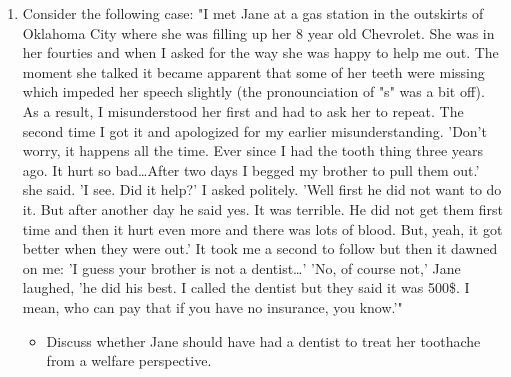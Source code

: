 \documentclass[a4paper]{article}
\begin{document}
\begin{enumerate}[resume]
\item Consider the following case: "I met Jane at a gas station in the outskirts of Oklahoma City where she was filling up her 8 year old Chevrolet. She was in her fourties and when I asked for the way she was happy to help me out. The moment she talked it became apparent that some of her teeth were missing which impeded her speech slightly (the pronounciation of "s" was a bit off). As a result, I misunderstood her first and had to ask her to repeat. The second time I got it and apologized for my earlier misunderstanding. 'Don't worry, it happens all the time. Ever since I had the tooth thing three years ago. It hurt so bad\ldots{}After two days I begged my brother to pull them out.' she said. 'I see. Did it help?' I asked politely. 'Well first he did not want to do it. But after another day he said yes. It was terrible. He did not get them first time and then it hurt even more and there was lots of blood. But, yeah, it got better when they were out.' It took me a second to follow but then it dawned on me: 'I guess your brother is  not a dentist\ldots{}' 'No, of course not,' Jane laughed, 'he did his best. I called the dentist but they said it was 500\$. I mean, who can pay that if you have no insurance, you know.'"
\begin{itemize}
\item Discuss whether Jane should have had a dentist to treat her toothache from a welfare perspective.
\end{itemize}
\end{enumerate}
\end{document}

